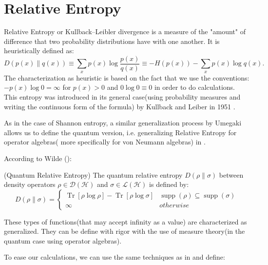 \section{Relative Entropy}
Relative Entropy or Kullback–Leibler divergence is a measure of the "amount" of difference that two probability distributions have with one another. It is heuristically defined as:
\begin{equation}
D(p(x) \| q(x)) \equiv \sum_{x} p(x) \log \frac{p(x)}{q(x)} \equiv-H(p(x))-\sum_{x} p(x) \log q(x).
\end{equation}
The characterization as heuristic is based on the fact that we use the conventions:$- p(x) \log 0 = \infty$ for $p(x)>0$ and $0 \log 0 \equiv 0$ in order to do calculations. This entropy was introduced in its general case(using probability measures and writing the continuous form of the formula) by Kullback and Leiber in 1951 \cite{kullback1951information}.
\par
As in the case of Shannon entropy, a similar generalization process by Umegaki allows us to define the quantum version, i.e. generalizing Relative Entropy for operator algebras( more specifically for von Neumann algebras) in \cite{umegaki1962conditional}.
\par 
According to Wilde (\citep{wilde2013quantum}):
\begin{definition}(Quantum Relative Entropy) The quantum relative entropy $D(\rho \| \sigma)$ between density operators $\rho \in \mathcal{D}(\mathcal{H})$ and $\sigma \in \mathcal{L}(\mathcal{H})$ is defined by:
\begin{equation}
D(\rho \| \sigma)= 
 \begin{cases} 
      \operatorname{Tr}[ \rho\log \rho ]-\operatorname{Tr} [ \rho \log \sigma]   & \operatorname{supp}(\rho) \subseteq \operatorname{supp}(\sigma) \\
      \infty & otherwise 
\end{cases}
\end{equation}
\end{definition}
\noindent
These types of functions(that may accept infinity as a value) are characterized as generalized. They can be define with rigor with the use of measure theory(in the quantum case using operator algebras).
\par
To ease our calculations, we can use the same techniques as in  and define:

